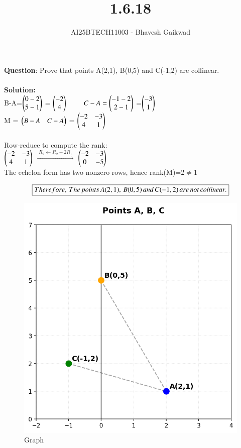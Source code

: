\documentclass[journal]{IEEEtran}
\begin{document}

\vspace{3cm}

\title{1.6.18}
\author{AI25BTECH11003 - Bhavesh Gaikwad}
{\let\newpage\relax\maketitle}

\renewcommand{\thefigure}{\theenumi}
\renewcommand{\thetable}{\theenumi}
\setlength{\intextsep}{10pt} 


\renewcommand{\thetable}{\theenumi}


\textbf{Question}: Prove that points A(2,1), B(0,5) and C(-1,2) are collinear.\\\\

\textbf{Solution:}\\

B-A=$\begin{pmatrix}0-2 \\ 5-1\end{pmatrix}$ = $\begin{pmatrix}-2 \\ 4\end{pmatrix}$
$\qquad C-A=\begin{pmatrix}-1-2 \\ 2-1\end{pmatrix}$ =$\begin{pmatrix}-3 \\ 1\end{pmatrix}$ \\
M = $\begin{pmatrix}B-A & C-A\end{pmatrix}$ = $\begin{pmatrix}-2 & -3 \\ 4 & 1\end{pmatrix}$\\\\

Row-reduce to compute the rank:\\

$\begin{pmatrix}-2 & -3\\ 4 & 1\end{pmatrix}$ $\xrightarrow{\;R_2\leftarrow R_2+2R_1\;}$ $\begin{pmatrix}-2 & -3 \\ 0 & -5\end{pmatrix}$\\

The echelon form has two nonzero rows, hence
rank(M)=2$\neq$1

\begin{align}
    \centering
    \boxed{Therefore, \, The \, points \, A(2,1), \,B(0,5) \, and \, C(-1,2) \, are \, not \, collinear.}
\end{align}
\bigskip

\begin{figure}[htbp]
    \centering
    \includegraphics[width=0.8\linewidth]{figs/fig1.png}
    \caption{Graph}
    \label{fig:fig/fig1.png}
\end{figure}
\end{document}
